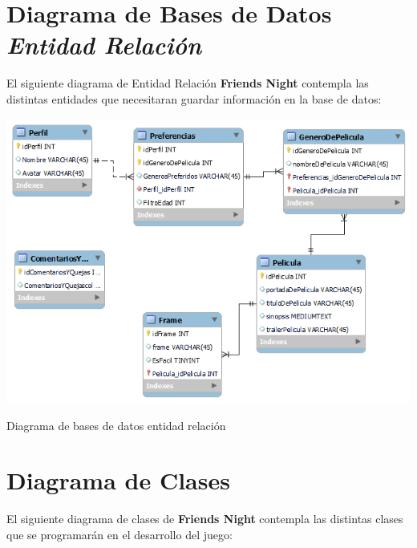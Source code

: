 \documentclass[12pt, oneside, letterpaper]{book}
\begin{document}
\section{Diagrama de Bases de Datos \textit{Entidad Relación} }
\fontsize{14}{18}\selectfont
\par 
El siguiente diagrama de Entidad Relación \textbf{Friends Night} contempla las distintas entidades que necesitaran guardar información en la base de datos:

\begin{center}
	\centering
		\includegraphics[width=1.2\textwidth]{DiagramaEntidadRelacionFriendsNight.png}

	\caption{Diagrama de bases de datos entidad relación}
	\label{DiagramaBasesDeDatos}
\end{center}
\vspace{1cm}

\section{Diagrama de Clases }
\fontsize{14}{18}\selectfont
\par 
El siguiente diagrama de clases de \textbf{Friends Night} contempla las distintas clases que se programarán en el desarrollo del juego:
\end{document}
